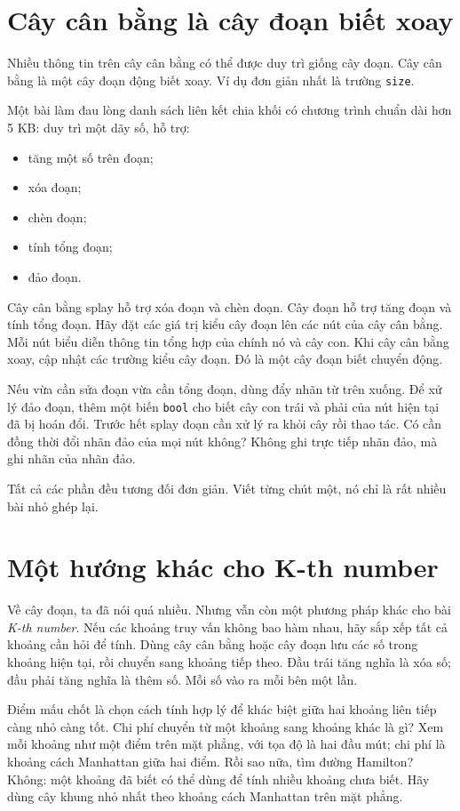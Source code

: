 \documentclass[11pt]{article}
\begin{document}
\section{Cây cân bằng là cây đoạn biết xoay}

Nhiều thông tin trên cây cân bằng có thể được duy trì giống cây đoạn.  Cây cân
bằng là một cây đoạn động biết xoay.  Ví dụ đơn giản nhất là trường
\texttt{size}.

Một bài làm đau lòng danh sách liên kết chia khối có chương trình chuẩn dài
hơn 5 KB: duy trì một dãy số, hỗ trợ:
\begin{itemize}
  \item tăng một số trên đoạn;
  \item xóa đoạn;
  \item chèn đoạn;
  \item tính tổng đoạn;
  \item đảo đoạn.
\end{itemize}

Cây cân bằng splay hỗ trợ xóa đoạn và chèn đoạn.  Cây đoạn hỗ trợ tăng đoạn
và tính tổng đoạn.  Hãy đặt các giá trị kiểu cây đoạn lên các nút của cây cân
bằng.  Mỗi nút biểu diễn thông tin tổng hợp của chính nó và cây con.  Khi cây
cân bằng xoay, cập nhật các trường kiểu cây đoạn.  Đó là một cây đoạn biết
chuyển động.

Nếu vừa cần sửa đoạn vừa cần tổng đoạn, dùng đẩy nhãn từ trên xuống.  Để xử lý
đảo đoạn, thêm một biến \texttt{bool} cho biết cây con trái và phải của nút
hiện tại đã bị hoán đổi.  Trước hết splay đoạn cần xử lý ra khỏi cây rồi thao
tác.  Có cần đồng thời đổi nhãn đảo của mọi nút không?  Không ghi trực tiếp
nhãn đảo, mà ghi nhãn của nhãn đảo.

Tất cả các phần đều tương đối đơn giản.  Viết từng chút một, nó chỉ là rất
nhiều bài nhỏ ghép lại.

\section{Một hướng khác cho K-th number}

Về cây đoạn, ta đã nói quá nhiều.  Nhưng vẫn còn một phương pháp khác cho bài
\emph{K-th number}.  Nếu các khoảng truy vấn không bao hàm nhau, hãy sắp xếp
tất cả khoảng cần hỏi để tính.  Dùng cây cân bằng hoặc cây đoạn lưu các số
trong khoảng hiện tại, rồi chuyển sang khoảng tiếp theo.  Đầu trái tăng nghĩa
là xóa số; đầu phải tăng nghĩa là thêm số.  Mỗi số vào ra mỗi bên một lần.

Điểm mấu chốt là chọn cách tính hợp lý để khác biệt giữa hai khoảng liên tiếp
càng nhỏ càng tốt.  Chi phí chuyển từ một khoảng sang khoảng khác là gì?  Xem
mỗi khoảng như một điểm trên mặt phẳng, với tọa độ là hai đầu mút; chi phí là
khoảng cách Manhattan giữa hai điểm.  Rồi sao nữa, tìm đường Hamilton?  Không:
một khoảng đã biết có thể dùng để tính nhiều khoảng chưa biết.  Hãy dùng cây
khung nhỏ nhất theo khoảng cách Manhattan trên mặt phẳng.
\end{document}
